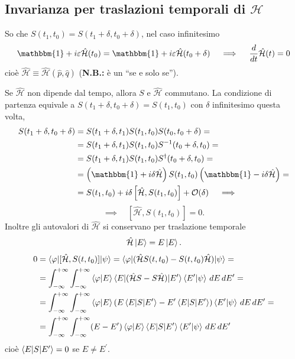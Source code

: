 \subsection{Invarianza per traslazioni temporali di \(\mathcal{H}\)}
So che \( S(t_1, t_0) = S(t_1 + \delta, t_0 + \delta) \), nel caso infinitesimo
\[
\mathbbm{1} + i \varepsilon \hat{\mathcal{H}}(t_0) = \mathbbm{1} + i \varepsilon \hat{\mathcal{H}}(t_0 + \delta) \quad \implies \quad \frac{d}{dt} \hat{\mathcal{H}}(t) = 0
\]
cioè \( \hat{\mathcal{H}} \equiv \hat{\mathcal{H}}(\hat{p}, \hat{q}) \) (\textbf{N.B.:} è un ``se e solo se'').

\bigskip
\noindent
Se \( \hat{\mathcal{H}} \) non dipende dal tempo, allora \( S \) e \( \hat{\mathcal{H}} \) commutano. La condizione di partenza equivale a \( S(t_1 + \delta, t_0 + \delta) = S(t_1, t_0) \) con \( \delta \) infinitesimo questa volta,
\begin{align*}
S(t_1 + \delta, t_0 + \delta) &= S(t_1 + \delta, t_1) S(t_1, t_0) S(t_0, t_0 + \delta) = \\
&= S(t_1 + \delta, t_1) S(t_1, t_0) S^{-1}(t_0 + \delta, t_0) = \\
&=  S(t_1 + \delta, t_1) S(t_1, t_0) S^\dag(t_0 + \delta, t_0) = \\
&= \left( \mathbbm{1} + i \delta \hat{\mathcal{H}} \right) S(t_1, t_0) \left( \mathbbm{1} - i \delta \hat{\mathcal{H}} \right) = \\
&= S(t_1, t_0) + i \delta \left[ \hat{\mathcal{H}}, S(t_1, t_0) \right] + \mathcal{O}(\delta) \quad \implies
\end{align*}
\[
\implies \quad \left[ \hat{\mathcal{H}}, S(t_1, t_0) \right] = 0.
\]
Inoltre gli autovalori di \( \hat{\mathcal{H}} \) si conservano per traslazione temporale
\[
\hat{\mathcal{H}} \ket{E} = E \ket{E}.
\]
\begin{align*}
0 &= \braket{\varphi|[\hat{\mathcal{H}}, S(t, t_0)]|\psi} = \braket{\varphi|(\hat{\mathcal{H}} S(t, t_0) - S(t, t_0) \hat{\mathcal{H}})|\psi} = \\
&= \int_{-\infty}^{+\infty} \int_{-\infty}^{+\infty} \braket{\varphi|E} \braket{E|(\hat{\mathcal{H}} S - S \hat{\mathcal{H}})|E^\prime} \braket{E^\prime|\psi} \, dE \, dE^\prime = \\
&= \int_{-\infty}^{+\infty} \int_{-\infty}^{+\infty} \braket{\varphi|E} \left( E \braket{E|S|E^\prime} - E^\prime \braket{E|S|E^\prime}\right) \braket{E^\prime|\psi} \, dE \, dE^\prime  = \\
&= \int_{-\infty}^{+\infty} \int_{-\infty}^{+\infty} (E - E^\prime) \braket{\varphi|E} \braket{E|S|E^\prime} \braket{E^\prime|\psi} \, dE \, dE^\prime
\end{align*}
cioè \( \braket{E|S|E^\prime} = 0 \) se \( E \neq E^\prime \).

